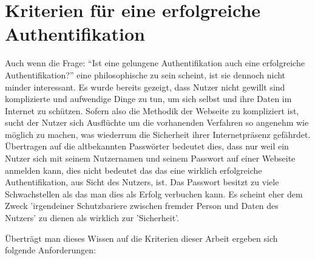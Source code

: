 \section{Kriterien für eine erfolgreiche Authentifikation}
Auch wenn die Frage: ``Ist eine gelungene Authentifikation auch eine erfolgreiche Authentifikation?'' eine philosophische zu sein scheint, ist sie dennoch nicht minder interessant. Es wurde bereits gezeigt, dass Nutzer nicht gewillt sind komplizierte und aufwendige Dinge zu tun, um sich selbst und ihre Daten im Internet zu schützen. Sofern also die Methodik der Webseite zu kompliziert ist, sucht der Nutzer sich Ausflüchte um die vorhanenden Verfahren so angenehm wie möglich zu machen, was wiederrum die Sicherheit ihrer Internetpräsenz gefährdet. Übertragen auf die altbekannten Passwörter bedeutet dies, dass nur weil ein Nutzer sich mit seinem Nutzernamen und seinem Passwort auf einer Webseite anmelden kann, dies nicht bedeutet das das eine wirklich erfolgreiche Authentifikation, aus Sicht des Nutzers, ist. Das Passwort besitzt zu viele Schwachstellen als das man dies als Erfolg verbuchen kann. Es scheint eher dem Zweck 'irgendeiner Schutzbariere zwischen fremder Person und Daten des Nutzers' zu dienen als wirklich zur 'Sicherheit'.

Überträgt man dieses Wissen auf die Kriterien dieser Arbeit ergeben sich folgende Anforderungen:

